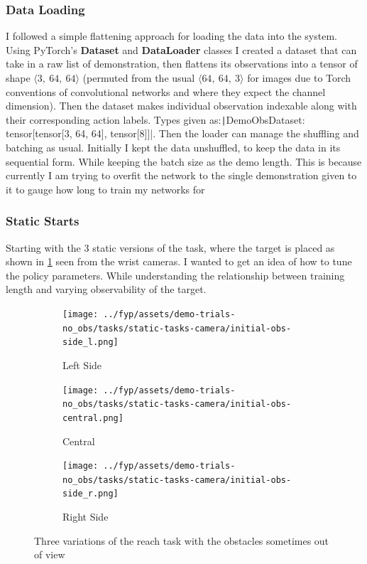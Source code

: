 \subsubsection{Data Loading}
I followed a simple flattening approach for loading the data into the system. Using PyTorch's \textbf{Dataset} and \textbf{DataLoader} classes I created a dataset that can take in a raw list of demonstration, then flattens its observations into a tensor of shape \(\langle 3,~64,~64 \rangle \) (permuted from the usual \(\langle 64,~64,~3 \rangle \) for images due to Torch conventions of convolutional networks and where they expect the channel  dimension). Then the dataset makes individual observation indexable along with their corresponding action labels. Types given as:\texttt|DemoObsDataset: tensor[tensor[3,  64, 64], tensor[8]]|. Then the loader can manage the shuffling and batching as usual. Initially I kept the data unshuffled, to keep the data in its sequential form. While keeping the batch size as the demo length. This is because currently I am trying to overfit the network to the single demonstration given to it to gauge how long to train my networks for


\subsubsection{Static Starts}
Starting with the 3 static versions of the task, where the target is placed as shown in \ref{fig:no-obs-3-views} seen from the wrist cameras. I wanted to get an idea of how to tune the policy parameters. While understanding the relationship between training length and varying observability of the target.

\begin{figure}[htbp]
  \begin{subfigure}{0.3\linewidth}
    \centering
    \texttt{[image: ../fyp/assets/demo-trials-no\_obs/tasks/static-tasks-camera/initial-obs-side\_l.png]}      
    \caption{Left Side}
  \end{subfigure}
  \hfill
  \begin{subfigure}{0.3\textwidth}
    \centering
    \texttt{[image: ../fyp/assets/demo-trials-no\_obs/tasks/static-tasks-camera/initial-obs-central.png]}
    \caption{Central}
  \end{subfigure}
  \hfill
  \begin{subfigure}{0.3\linewidth}
    \centering
    \texttt{[image: ../fyp/assets/demo-trials-no\_obs/tasks/static-tasks-camera/initial-obs-side\_r.png]}
    \caption{Right Side}
  \end{subfigure}%
  \caption{Three variations of the reach task with the obstacles sometimes out of view}\label{fig:no-obs-3-views}
\end{figure}




